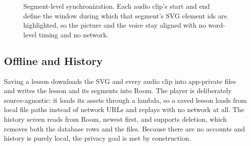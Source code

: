 \documentclass[conference]{IEEEtran}
\begin{document}
\begin{figure}[t]
\centering
{}
\caption{Segment-level synchronization. Each audio clip's start and end define
the window during which that segment's SVG element ids are highlighted, so the
picture and the voice stay aligned with no word-level timing and no network.}
\label{fig:sync}
\end{figure}

\subsection{Offline and History}
Saving a lesson downloads the SVG and every audio clip into app-private files
and writes the lesson and its segments into Room. The player is deliberately
source-agnostic: it loads its assets through a lambda, so a saved lesson loads
from local file paths instead of network URLs and replays with no network at
all. The history screen reads from Room, newest first, and supports deletion,
which removes both the database rows and the files. Because there are no
accounts and history is purely local, the privacy goal is met by construction.
\end{document}
